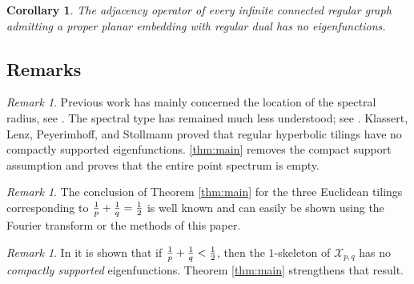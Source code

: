 \documentclass[11pt]{article}
\newtheorem{corollary}[theorem]{Corollary}
\theoremstyle{remark}
\newtheorem{remark}[theorem]{Remark}
\newcommand{\cX}{\mathcal X}
\begin{document}
\begin{corollary}\label{cor:main}
The adjacency operator of every infinite connected regular graph admitting a proper planar embedding with regular dual has no eigenfunctions. 
\end{corollary}

\subsection{Remarks}

\begin{remark} Previous work has mainly concerned the location of the spectral radius, see \cite{Bar02, DvoMo10, Nag25, Warzel15, Zuk97}. The spectral type has remained much less understood; see \cite[Section 3.2]{Warzel15}. Klassert, Lenz, Peyerimhoff, and Stollmann \cite[Theorem 4]{NoCompact06} proved that regular hyperbolic tilings have no compactly supported eigenfunctions. \cref{thm:main} removes the compact support assumption and proves that the entire point spectrum is empty.
\end{remark}

\begin{remark}
The conclusion of Theorem \ref{thm:main} for the three Euclidean tilings corresponding to ${1 \over p}+{1\over q}={1 \over 2}$ is well known and can easily be shown using the Fourier transform or the methods of this paper.
\end{remark}
\begin{remark} In \cite[Theorem 4]{NoCompact06} it is shown that if ${1 \over p} + {1 \over q} < {1\over 2}$, then the $1$-skeleton of $\cX_{p,q}$ has no \emph{compactly supported} eigenfunctions. Theorem \ref{thm:main} strengthens that result. 
\end{remark}
\end{document}
